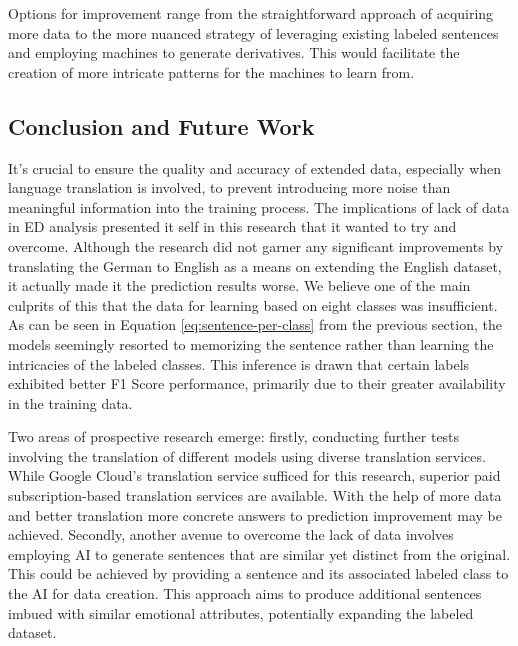 \documentclass[11pt]{article}
\begin{document}
Options for improvement range from the straightforward approach of acquiring more data to the more nuanced strategy of leveraging existing labeled sentences and employing machines to generate derivatives. This would facilitate the creation of more intricate patterns for the machines to learn from. 

\subsection{Conclusion and Future Work}
It's crucial to ensure the quality and accuracy of extended data, especially when language translation is involved, to prevent introducing more noise than meaningful information into the training process. The implications of lack of data in ED analysis presented it self in this research that it wanted to try and overcome. Although the research did not garner any significant improvements by translating the German to English as a means on extending the English dataset, it actually made it the prediction results worse. We believe one of the main culprits of this that the data for learning based on eight classes was insufficient. As can be seen in Equation \ref{eq:sentence-per-class} from the previous section, the models seemingly resorted to memorizing the sentence rather than learning the intricacies of the labeled classes. This inference is drawn that certain labels exhibited better F1 Score performance, primarily due to their greater availability in the training data.

Two areas of prospective research emerge: firstly, conducting further tests involving the translation of different models using diverse translation services. While Google Cloud's translation service sufficed for this research, superior paid subscription-based translation services are available. With the help of more data and better translation more concrete answers to prediction improvement may be achieved. Secondly, another avenue to overcome the lack of data involves employing AI to generate sentences that are similar yet distinct from the original. This could be achieved by providing a sentence and its associated labeled class to the AI for data creation. This approach aims to produce additional sentences imbued with similar emotional attributes, potentially expanding the labeled dataset.

\clearpage
{}
\printbibliography
\clearpage


\listoffigures
\clearpage


\appendix
\end{document}
